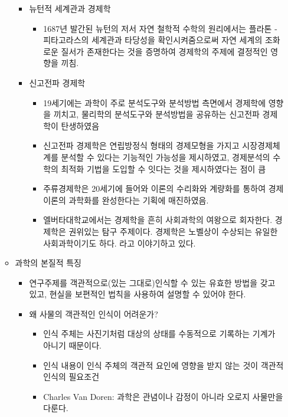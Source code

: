 \documentclass{report}
\begin{document}
\begin{itemize}
\begin{itemize}
\begin{itemize}
\begin{itemize}
            \end{itemize}
            \item 뉴턴적 세계관과 경제학
            \begin{itemize}
                \item 1687년 발간된 뉴턴의 저서 자연 철학적 수학의 원리에서는 플라톤 - 피타고라스의 세계관과 타당성을 확인시켜줌으로써 자연 세계의 조화로운 질서가 존재한다는 것을 증명하여 경제학의 주제에 결정적인 영향을 끼침.
            \end{itemize}
            \item 신고전파 경제학
            \begin{itemize}
                \item 19세기에는 과학이 주로 분석도구와 분석방법 측면에서 경제학에 영향을 끼치고, 물리학의 분석도구와 분석방법을 공유하는 신고전파 경제학이 탄생하였음
                \item 신고전파 경제학은 연립방정식 형태의 경제모형을 가지고 시장경제체계를 분석할 수 있다는 기능적인 가능성을 제시하였고, 경제분석의 수학의 최적화 기법을 도입할 수 잇다는 것을 제시하였다는 점이 큼
                \item 주류경제학은 20세기에 들어와 이론의 수리화와 계량화를 통하여 경제이론의 과학화를 완성한다는 기획에 매진하였음.
                \item 엘버타대학교에서는 경제학을 흔히 사회과학의 여왕으로 회자한다. 경제학은 권위있는 탐구 주제이다. 경제학은 노벨상이 수상되는 유일한 사회과학이기도 하다. 라고 이야기하고 있다.
            \end{itemize}
        \end{itemize}
        \item 과학의 본질적 특징
        \begin{itemize}
            \item 연구주제를 객관적으로(있는 그대로)인식할 수 있는 유효한 방법을 갖고 있고, 현실을 보편적인 법칙을 사용하여 설명할 수 있어야 한다.
            \item 왜 사물의 객관적인 인식이 어려운가?
            \begin{itemize}
                \item 인식 주체는 사진기처럼 대상의 상태를 수동적으로 기록하는 기계가 아니기 때문이다.
                \item 인식 내용이 인식 주체의 객관적 요인에 영향을 받지 않는 것이 객관적 인식의 필요조건
                \item Charles Van Doren: 과학은 관념이나 감정이 아니라 오로지 사물만을 다룬다.
            \end{itemize}

\end{itemize}
\end{itemize}
\end{itemize}
\end{document}
